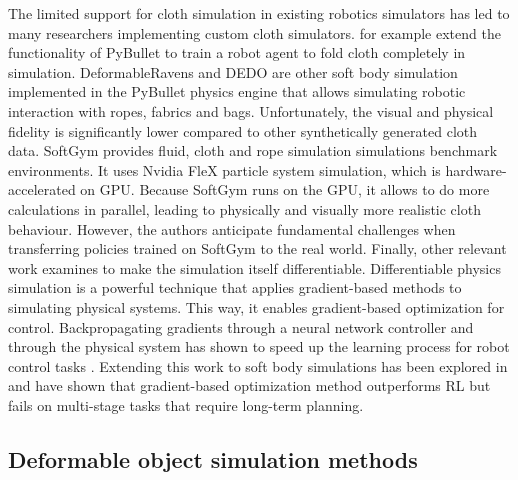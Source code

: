 \documentclass[\home/main.tex]{subfiles}
\begin{document}
The limited support for cloth simulation in existing robotics simulators has led to many researchers implementing custom cloth simulators. \textcite{Matas2018} for example extend the functionality of PyBullet to train a robot agent to fold cloth completely in simulation. DeformableRavens \autocite{seita2021learning} and DEDO \autocite{dedo} are other soft body simulation implemented in the PyBullet physics engine that allows simulating robotic interaction with ropes, fabrics and bags. Unfortunately, the visual and physical fidelity is significantly lower compared to other synthetically generated cloth data. SoftGym \autocite{softgym} provides fluid, cloth and rope simulation simulations benchmark environments. It uses Nvidia FleX particle system simulation, which is hardware-accelerated on \gls{GPU}. Because SoftGym runs on the \gls{GPU}, it allows to do more calculations in parallel, leading to physically and visually more realistic cloth behaviour. However, the authors anticipate fundamental challenges when transferring policies trained on SoftGym to the real world. Finally, other relevant work examines to make the simulation itself differentiable. Differentiable physics simulation is a powerful technique that applies gradient-based methods to simulating physical systems. This way, it enables gradient-based optimization for control.
Backpropagating gradients through a neural network controller and through the physical system has shown to speed up the learning process for robot control tasks \autocite{Degrave2019}. Extending this work to soft body simulations has been explored in \autocite{liang2019differentiable,huang2021plasticinelab} and have shown that gradient-based optimization method outperforms RL but fails on multi-stage tasks that require long-term planning.

\subsection{Deformable object simulation methods} \label{subsec:lit_cloth_sim}
\end{document}
